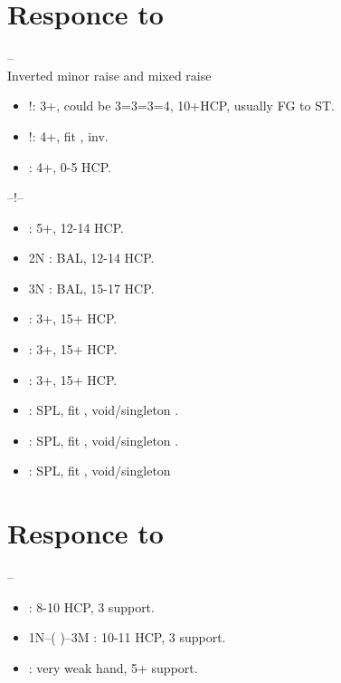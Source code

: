 \documentclass[12pt,twoside,a5paper]{report}%
\begin{document}
\chapter*{Responce to }
	-- \\

	Inverted minor raise and mixed raise
	\begin{itemize}
	\renewcommand{\labelitemi}{}
	\item {}!: 3+\di{}, could be 3=3=3=4, 10+HCP, usually FG to ST. 
	\item {}!: 4+\di{}, fit \di{}, inv.  
	\item {} : 4+\di{}, 0-5 HCP. 
	\end{itemize}

	--!--
	\begin{itemize}
	\renewcommand{\labelitemi}{}
	\item {} : 5+\di{}, 12-14 HCP.
	\item 2N : BAL, 12-14 HCP.
	\item 3N : BAL, 15-17 HCP.
	\item {} : 3+\he{}, 15+ HCP.
	\item {} : 3+\sp{}, 15+ HCP.
	\item {} : 3+\cl{}, 15+ HCP.
	\item {} : SPL, fit \di{}, void/singleton \he{}.
	\item {} : SPL, fit \di{}, void/singleton \sp{}.
	\item {} : SPL, fit \di{}, void/singleton \cl{}
	\end{itemize}

\chapter*{Responce to }
	-- \\
	\begin{itemize}
	\renewcommand{\labelitemi}{}
	\item {} : 8-10 HCP, 3\he{} support.
	\item 1N--( )--3M : 10-11 HCP, 3\he{} support.
	\item {} : very weak hand, 5+\he{} support.
	\end{itemize}
\end{document}
